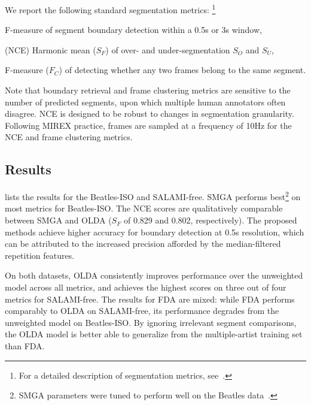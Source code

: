 \documentclass{article}
\begin{document}
We report the following standard segmentation metrics:
\footnote{For a detailed description of segmentation metrics, see~\cite{mirexstructure}.}
\begin{description}\addtolength{\itemsep}{-0.25\baselineskip}%
\item[Boundary retrieval] F-measure of segment boundary detection within a 0.5s or 3s window,
\item[Normalized conditional entropy] (NCE) Harmonic mean ($S_F$) of over- and under-segmentation $S_O$ and $S_U$, 
\item[Frame clustering] F-measure ($F_C$) of detecting whether any two frames belong to the same segment.
\end{description}
Note that boundary retrieval and frame clustering metrics are sensitive to the number of
predicted segments, upon which multiple human annotators often disagree.
NCE is designed to be robust to changes in segmentation granularity.
Following MIREX practice, frames are sampled at a frequency of 10Hz for the NCE and frame clustering metrics. 


\subsection{Results}
\label{sec:results}


 lists the results for the Beatles-ISO and SALAMI-free.
SMGA performs best\footnote{SMGA parameters were tuned to perform well on the Beatles data~\cite{serra2012unsupervised}.}
on most metrics for Beatles-ISO.\@
The NCE scores are qualitatively comparable between SMGA and OLDA ($S_F$ of 0.829 and 0.802, respectively).
The proposed methods achieve higher accuracy for boundary detection at 0.5s resolution, which can be attributed to the increased
precision afforded by the median-filtered repetition features.

On both datasets, OLDA consistently improves performance over the unweighted model across all metrics, and achieves the highest scores on three out of four metrics for SALAMI-free.
The results for FDA are mixed: while FDA performs comparably to OLDA on SALAMI-free, its performance degrades from the unweighted model on Beatles-ISO.\@
By ignoring irrelevant segment comparisons, the OLDA model is better able to generalize from the multiple-artist training set than FDA.\@
\end{document}
